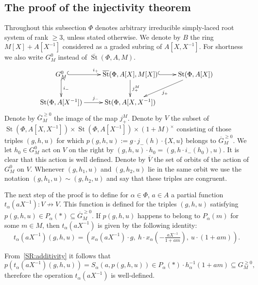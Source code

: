\documentclass[oneside, 8pt]{amsart}
\theoremstyle{remark}
\theoremstyle{definition}
\DeclareMathOperator{\St}{St}
\newcommand{\inv}{^{-1}}
\numberwithin{equation}{section}
\begin{document}
\subsection{The proof of the injectivity theorem}
Throughout this subsection $\Phi$ denotes arbitrary irreducible simply-laced root system of rank $\geq 3$, unless stated otherwise.
We denote by $B$ the ring $M[X] + A[X^{-1}]$ considered as a graded subring of $A[X, X^{-1}]$.
For shortness we also write $G_M^0$ instead of $\overline{\St}(\Phi, A, M)$.
\[ \xymatrix{ G_M^0 \ar@{^{(}->}[r]^{i_+} \ar@{^{(}->}[d]^{i_-} & \overline{\St}(\Phi, A[X], M[X]) \ar^{j_+^M}[d] \ar@{^{(}->}[r] & \St(\Phi, A[X]) \ar[dl]^{j_+} \\
              \St(\Phi, A[X\inv]) \ar[r]^{j_-} & \St(\Phi, A[X, X^{-1}]) &  } \] 
Denote by $\overline{G}^{\geq 0}_M$ the image of the map $j_+^M$. 
Denote by $V$ the subset of $\St(\Phi, A[X, X^{-1}]) \times \St(\Phi, A[X\inv]) \times (1 + M)^\times$ consisting of those triples $(g, h, u)$ for which 
$p(g, h, u) := g \cdot j_-(h) \cdot \{ X, u \}$ belongs to $\overline{G}_M^{\geq 0}$.
We let $h_0 \in G_M^0$ act on $V$ on the right by $(g, h, u) \cdot h_0 = (g, h \cdot i_-(h_0), u)$.
It is clear that this action is well defined.
Denote by $\overline{V}$ the set of orbits of the action of $G_M^0$ on $V$.
Whenever $(g, h_1, u)$ and $(g, h_2, u)$ lie in the same orbit we use the notation $(g, h_1, u) \sim (g, h_2, u)$ and say that these triples are congruent.

The next step of the proof is to define for $\alpha \in \Phi$, $a \in A$ a partial function $t_\alpha(aX^{-1}) \colon V \not\to V$.
This function is defined for the triples $(g, h, u)$ satisfying $p(g, h, u) \in P_\alpha(*) \subseteq \overline{G}_M^{\geq 0}$.
If $p(g, h, u)$ happens to belong to $P_\alpha(m)$ for some $m \in M$, then $t_\alpha(aX^{-1})$ is given by the following identity:
\[ t_\alpha(aX^{-1}) (g, h, u) = \left( x_\alpha(aX^{-1})\cdot g ,\ h \cdot x_\alpha\left(-\tfrac{aX^{-1}}{1 + am}\right),\ u \cdot (1 + am)\right).\]

From~\cref{SR:additivity} it follows that
\[p\left(t_\alpha(aX^{-1}) (g, h, u)\right) = S_\alpha(a, p(g, h, u)) \in P_\alpha(*) \cdot h_{\alpha}^{-1}(1+am) \subseteq G_M^{\geq 0},\]
therefore the operation $t_\alpha(aX^{-1})$ is well-defined.
\end{document}

